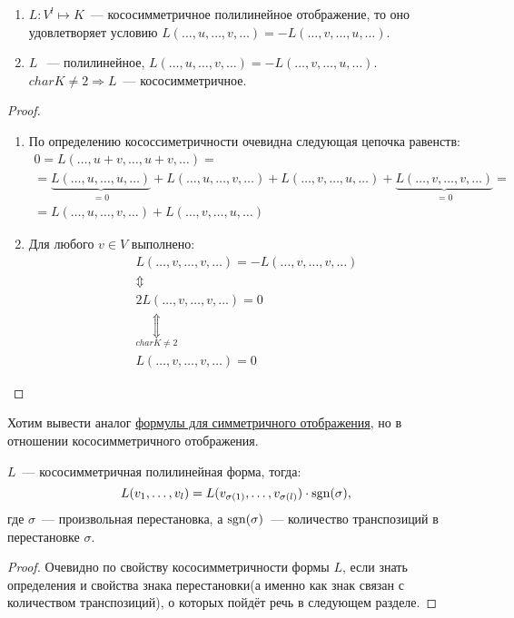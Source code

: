 \begin{statement}\leavevmode
    \begin{enumerate}
        \item
            $L: V^l\mapsto K$~--- кососимметричное полилинейное отображение, то
            оно удовлетворяет условию $L(\dots, u,\dots, v,\dots) = -L(\dots,v,\dots,u,\dots)$.
        \item 
            $L~$~--- полилинейное, $L(\dots, u,\dots,v,\dots) = -L(\dots, v,\dots, u,\dots)$.
            $char K \not= 2 \Rightarrow L$~--- кососимметричное.
    \end{enumerate}
\end{statement}
\begin{proof}\leavevmode\\
    \begin{enumerate}
        \item
            По определению кососсиметричности очевидна следующая цепочка равенств:
            \[
                \begin{gathered}
                    0 = L(\dots, u + v, \dots, u + v,\dots) =\\=
                    \underbrace{L(\dots, u,\dots, u,\dots)}_{=0} + L(\dots, u, \dots, v,\dots) + 
                    L(\dots, v,\dots,u,\dots)+\underbrace{L(\dots, v,\dots, v, \dots)}_{=0}=\\=
                    L(\dots, u,\dots, v,\dots) + L(\dots, v,\dots, u,\dots)
                \end{gathered}
            \]
        \item
            Для любого $v\in V$ выполнено:
            \[
                \begin{gathered}
                    L(\dots, v,\dots,v,\dots) = -L(\dots,v,\dots,v,\dots)
                    \\\Updownarrow\\
                    2L(\dots,v,\dots,v,\dots) = 0 
                    \\\underset{char K \not= 2}{\Updownarrow}\\
                    L(\dots, v,\dots,v,\dots) = 0
                \end{gathered}
            \]
    \end{enumerate}
\end{proof}
\begin{motivation}
    Хотим вывести аналог \hyperref[eq:7:1]{формулы для симметричного отображения}, но в отношении кососимметричного отображения.
\end{motivation}
\begin{statement}
    $L$~--- кососимметричная полилинейная форма, тогда:
    \[
        L(v_1,\dots, v_l) = L(v_{\sigma(1)},\dots, v_{\sigma(l)})\cdot \operatorname{sgn}(\sigma),
    \]
    где $\sigma$~--- произвольная перестановка, а $\operatorname{sgn}(\sigma)$~--- количество транспозиций в перестановке $\sigma$.
\end{statement}
\begin{proof}
    Очевидно по свойству кососимметричности формы $L$, если знать 
    определения и свойства знака перестановки(а именно как знак связан с количеством транспозиций),
    о которых пойдёт речь в следующем разделе.
\end{proof}

